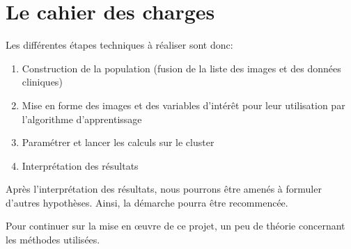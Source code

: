 \section{Le cahier des charges}

Les différentes étapes techniques à réaliser sont donc:
\begin{enumerate}
 \item Construction de la population (fusion de la liste des images et des données cliniques)
 \item Mise en forme des images et des variables d'intérêt pour leur utilisation par l'algorithme d'apprentissage
 \item Paramétrer et lancer les calculs sur le cluster
 \item Interprétation des résultats
\end{enumerate}


Après l'interprétation des résultats, nous pourrons être amenés à formuler d'autres hypothèses.
Ainsi, la démarche pourra être recommencée.

Pour continuer sur la mise en œuvre de ce projet, un peu de théorie concernant les méthodes utilisées. 